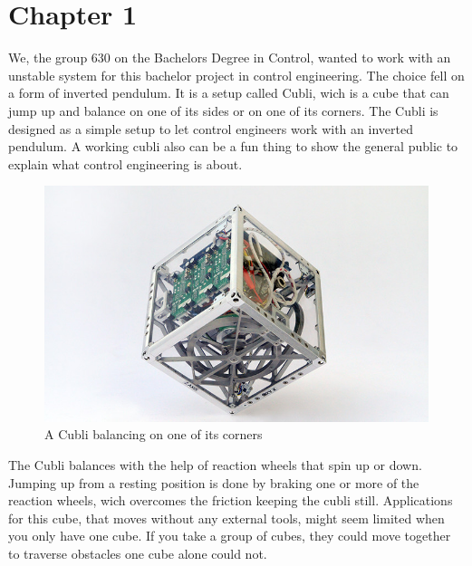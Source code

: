\chapter{Chapter 1}
We, the group 630 on the Bachelors Degree in Control, wanted to work with an unstable system for this bachelor project in control engineering. The choice fell on a form of inverted pendulum. It is a setup called Cubli, wich is a cube that can jump up and balance on one of its sides or on one of its corners.
The Cubli is designed as a simple setup to let control engineers work with an inverted pendulum. A working cubli also can be a fun thing to show the general public to explain what control engineering is about.  \cite{MGajamohan}

\begin{figure}[H] 
	\centering 
	\includegraphics[scale=1.3]{figures/CubliCorner-700x430}
	\caption{A Cubli balancing on one of its corners\cite{RAndrea}}
	\label{CubliCorner}
\end{figure} 
The Cubli balances with the help of reaction wheels that spin up or down. Jumping up from a resting position is done by braking one or more of the reaction wheels, wich overcomes the friction keeping the cubli still. 
Applications for this cube, that moves without any external tools, might seem limited when you only have one cube. If you take a group of cubes, they could move together to traverse obstacles one cube alone could not. \cite{JRomanishin}

